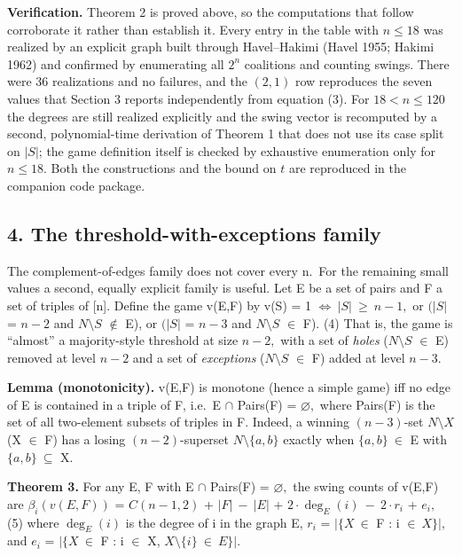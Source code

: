 \documentclass[
]{article}
\begin{document}
\textbf{Verification.} Theorem 2 is proved above, so the computations
that follow corroborate it rather than establish it. Every entry in the
table with \(n \le 18\) was realized by an explicit graph built through
Havel--Hakimi (Havel 1955; Hakimi 1962) and confirmed by enumerating all
\(2^n\) coalitions and counting swings. There were 36 realizations and
no failures, and the \((2,1)\) row reproduces the seven values that
Section 3 reports independently from equation (3). For
\(18 < n \le 120\) the degrees are still realized explicitly and the
swing vector is recomputed by a second, polynomial-time derivation of
Theorem 1 that does not use its case split on \(|S|\); the game
definition itself is checked by exhaustive enumeration only for
\(n \le 18\). Both the constructions and the bound on \(t\) are
reproduced in the companion code package.

\subsection{4. The threshold-with-exceptions
family}\label{the-threshold-with-exceptions-family}

The complement-of-edges family does not cover every n.~For the remaining
small values a second, equally explicit family is useful. Let E be a set
of pairs and F a set of triples of {[}n{]}. Define the game v(E,F) by
v(S) = 1 \(\iff\ \vert S\vert\ \ge\ n-1,\) or \((\vert S\vert\) =
\(n-2\) and \(N\setminus S\) \(\notin\) E), or \((\vert S\vert\) =
\(n-3\) and \(N\setminus S\) \(\in\) F). (4) That is, the game is
``almost'' a majority-style threshold at size \(n-2,\) with a set of
\emph{holes} (\(N\setminus S\) \(\in\) E) removed at level \(n-2\) and a
set of \emph{exceptions} (\(N\setminus S\) \(\in\) F) added at level
\(n-3.\)

\textbf{Lemma (monotonicity).} v(E,F) is monotone (hence a simple game)
iff no edge of E is contained in a triple of F, i.e.~E \(\cap\) Pairs(F)
= \(\varnothing,\) where Pairs(F) is the set of all two-element subsets
of triples in F. Indeed, a winning \((n-3)\)-set \(N\setminus X\) (X
\(\in\) F) has a losing \((n-2)\)-superset \(N\setminus\{a,b\}\) exactly
when \(\{a,b\}\ \in\) E with \(\{a,b\}\ \subseteq\) X.

\textbf{Theorem 3.} For any E, F with E \(\cap\) Pairs(F) =
\(\varnothing,\) the swing counts of v(E,F) are \(\beta_i(v(E,F))\) =
\(C(n-1,2)\) + \(\vert F\vert\ -\ \vert E\vert\) +
\(2\cdot\deg_E(i)\ -\ 2\cdot r_i\) + \(e_i,\) (5) where \(\deg_E(i)\) is
the degree of i in the graph E, \(r_i\) = \(\vert\{X\ \in\) F : i
\(\in\ X\}\vert,\) and \(e_i\) = \(\vert\{X\ \in\) F : i \(\in\) X,
\(X\setminus\{i\}\ \in\ E\}\vert.\)
\end{document}

